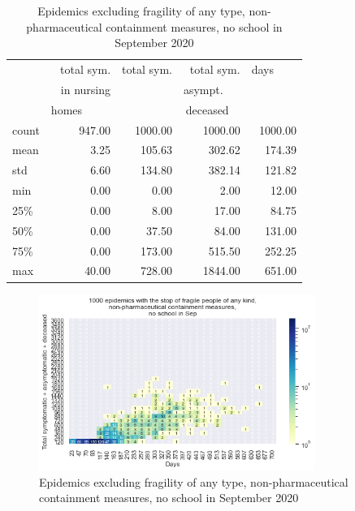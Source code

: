 \documentclass[11pt]{article}
\begin{document}
\begin{table}[H]
\center
\small
\begin{tabular}{lrrrr}
\toprule
{} & total sym.        &  total sym. & total sym.     & days~~~~ \\
{} & in nursing        &                  & asympt.~~~  & \\
{} & homes~~~~~  &                  & deceased~~ & \\
\midrule
count &     947.00 &             1000.00 &                 1000.00 & 1000.00 \\
mean  &       3.25 &              105.63 &                  302.62 &  174.39 \\
std   &       6.60 &              134.80 &                  382.14 &  121.82 \\
min   &       0.00 &                0.00 &                    2.00 &   12.00 \\
25\%   &       0.00 &                8.00 &                   17.00 &   84.75 \\
50\%   &       0.00 &               37.50 &                   84.00 &  131.00 \\
75\%   &       0.00 &              173.00 &                  515.50 &  252.25 \\
max   &      40.00 &              728.00 &                 1844.00 &  651.00 \\
\bottomrule
\end{tabular}

\label{EpidemicsNoAllFragileT}
\caption{Epidemics excluding fragility of any type, non-pharmaceutical containment measures, no school in September 2020}
\end{table}


\begin{figure}[H]
\begin{center}
\includegraphics[width=0.8\textwidth]{HM30_readRunResults1k_with_NoAllFrag_at20_plusHMlog.png}
\caption{Epidemics excluding fragility of any type, non-pharmaceutical containment measures, no school in September 2020}
\label{EpidemicsNoAllFragileHM}
\end{center}
\end{figure}
\end{document}
